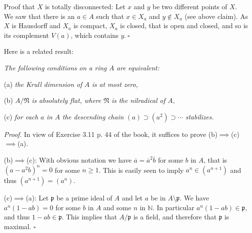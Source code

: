 \documentclass[parskip=half,fontsize=12pt]{scrartcl}%
\newcommand{\mf}{\mathfrak}
\newcommand{\mmm}{\mf m}
\newcommand{\ppp}{\mf p}
\begin{document}
\begin{comment}
Let $\mu\in\mf m\subset A$ with $\mf m$ maximal. By Section~\ref{310ii} p.~\pageref{310ii} above, it suffices to show that, in the above notation, we have %
$\overline\mu=\overline0$. By Corollary 3.12 p.~42 of the book, this is equivalent to showing that %
the element $\mu/1$ of $A_\mmm$ is nilpotent, which is clear since $\mf m$ is a minimal prime ideal of $A$ (and thus $\mmm_\mmm$ is the nilradical of $A_\mmm$). $\square$
\end{comment}

Proof that $X$ is totally disconnected: Let $x$ and $y$ be two different points of $X$. We saw that there is an $a\in A$ such that $x\in X_a$ and $y\notin X_a$ (see above claim). As $X$ is Hausdorff and $X_a$ is compact, $X_a$ is closed, that is open and closed, and so is its complement $V(a)$, which contains $y.\ \square$

Here is a related result:

\emph{The following conditions on a ring $A$ are equivalent:}

(a) \emph{the Krull dimension of $A$ is at most zero,}

(b) \emph{$A/\mf N$ is absolutely flat, where $\mf N$ is the nilradical of $A$,}

(c) \emph{for each $a$ in $A$ the descending chain $(a)\supset(a^2)\supset\cdots$ stabilizes.}

\emph{Proof.} In view of Exercise 3.11 p. 44 of the book, it suffices to prove (b)$\implies$(c)$\implies$(a). %

(b)$\implies$(c): With obvious notation we have $\overline a=\overline a^2\overline b$ for some $b$ in $A$, that is $(a-a^2b)^n=0$ for some $n\ge1$. This is easily seen to imply $a^n\in(a^{n+1})$ and thus $(a^{n+1})=(a^n)$. 

(c)$\implies$(a): Let $\ppp$ be a prime ideal of $A$ and let $a$ be in $A\setminus\ppp$. We have $a^n(1-ab)=0$ for some $b$ in $A$ and some $n$ in $\mathbb N$. In particular $a^n(1-ab)\in\ppp$, and thus $1-ab\in\ppp$. This implies that $A/\ppp$ is a field, and therefore that $\ppp$ is maximal. $\square$
\end{document}
